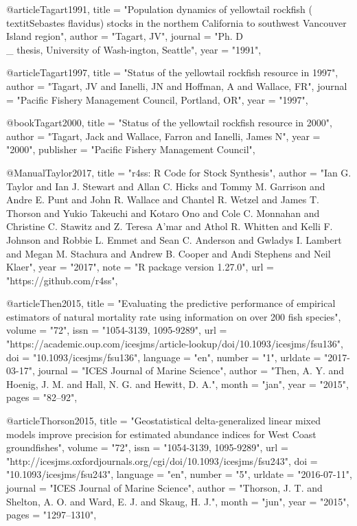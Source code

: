 @article{Tagart1991,
    title = "{Population dynamics of yellowtail rockfish (\\textit{{Sebastes} flavidus}) stocks in the northem California to southwest Vancouver Island region}",
    author = "{Tagart, JV}",
    journal = "{Ph. D\\_ thesis, University of Wash-ington, Seattle}",
    year = "{1991}",
}

@article{Tagart1997,
    title = "{Status of the yellowtail rockfish resource in 1997}",
    author = "{Tagart, JV and Ianelli, JN and Hoffman, A and Wallace, FR}",
    journal = "{Pacific Fishery Management Council, Portland, OR}",
    year = "{1997}",
}

@book{Tagart2000,
    title = "{Status of the yellowtail rockfish resource in 2000}",
    author = "{Tagart, Jack and Wallace, Farron and Ianelli, James N}",
    year = "{2000}",
    publisher = "{Pacific Fishery Management Council}",
}

@Manual{Taylor2017,
    title = "{r4ss: R Code for Stock Synthesis}",
    author = "{Ian G. Taylor and Ian J. Stewart and Allan C. Hicks and Tommy M. Garrison and Andre E. Punt and John R. Wallace and Chantel R. Wetzel and James T. Thorson and Yukio Takeuchi and Kotaro Ono and Cole C. Monnahan and Christine C. Stawitz and Z. Teresa A'mar and Athol R. Whitten and Kelli F. Johnson and Robbie L. Emmet and Sean C. Anderson and Gwladys I. Lambert and Megan M. Stachura and Andrew B. Cooper and Andi Stephens and Neil Klaer}",
    year = "{2017}",
    note = "{R package version 1.27.0}",
    url = "{https://github.com/r4ss}",
}

@article{Then2015,
    title = "{Evaluating the predictive performance of empirical estimators of natural mortality rate using information on over 200 fish species}",
    volume = "{72}",
    issn = "{1054-3139, 1095-9289}",
    url = "{https://academic.oup.com/icesjms/article-lookup/doi/10.1093/icesjms/fsu136}",
    doi = "{10.1093/icesjms/fsu136}",
    language = "{en}",
    number = "{1}",
    urldate = "{2017-03-17}",
    journal = "{ICES Journal of Marine Science}",
    author = "{Then, A. Y. and Hoenig, J. M. and Hall, N. G. and Hewitt, D. A.}",
    month = "jan",
    year = "{2015}",
    pages = "{82--92}",
}

@article{Thorson2015,
    title = "{Geostatistical delta-generalized linear mixed models improve precision for estimated abundance indices for {West} {Coast} groundfishes}",
    volume = "{72}",
    issn = "{1054-3139, 1095-9289}",
    url = "{http://icesjms.oxfordjournals.org/cgi/doi/10.1093/icesjms/fsu243}",
    doi = "{10.1093/icesjms/fsu243}",
    language = "{en}",
    number = "{5}",
    urldate = "{2016-07-11}",
    journal = "{ICES Journal of Marine Science}",
    author = "{Thorson, J. T. and Shelton, A. O. and Ward, E. J. and Skaug, H. J.}",
    month = "jun",
    year = "{2015}",
    pages = "{1297--1310}",
}

